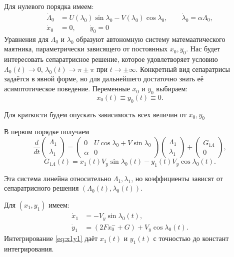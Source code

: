 Для нулевого порядка имеем:
\begin{equation}
    \begin{aligned}
        \dot{\Lambda}_0 &= U(\lambda_0) \sin\lambda_0 - V(\lambda_0) \cos\lambda_0, \qquad
        \dot{\lambda}_0 = \alpha \Lambda_0, \\[1.5ex]
        \dot{x}_0 &= 0, \qquad \dot{y}_0 = 0
    \end{aligned}
    \label{leadorder}
\end{equation}
Уравнения для $\Lambda_0$ и $\lambda_0$ образуют автономную систему матемаатического маятника, параметрически зависящего от постоянных $x_0, y_0$. Нас будет интересовать сепаратрисное решение, которое удовлетворяет условию $\Lambda_0(t) \to 0$, $\lambda_0(t) \to \pi \pm \pi$ при $t \to \pm\infty$. Конкретный вид сепаратрисы задаётся в явной форме, но для дальнейшего достаточно знать её асимптотическое поведение.
Переменные $x_0$ и $y_0$ выбираем:
$$
x_0(t) \equiv  y_0(t) \equiv 0.
$$

Для краткости будем опускать зависимость всех величин от $x_0,y_0$

В первом порядке получаем
\begin{equation}
    \frac{d}{dt} \begin{pmatrix} \Lambda_1 \\ \lambda_1 \end{pmatrix}
    = \begin{pmatrix}
        0 & U\cos\lambda_0 + V\sin\lambda_0 \\
        \alpha & 0
    \end{pmatrix}
    \begin{pmatrix} \Lambda_1 \\ \lambda_1 \end{pmatrix}
    +
    \begin{pmatrix} G_{1 \Lambda} \\ 0 \end{pmatrix},
    \label{1order}
\end{equation}
$$
G_{1 \Lambda}(t) = x_1(t) V_y \sin \lambda_0(t) - y_1(t) V_y \cos \lambda_0(t).
$$

Эта система линейна относительно $\Lambda_1,\lambda_1$, но коэффициенты зависят от сепаратрисного решения $(\Lambda_0(t),\lambda_0(t))$.

Для $(x_1,y_1)$ имеем:
\begin{equation}
    \begin{aligned}
        \dot{x}_1 &= -V_y \sin \lambda_0(t), \\[1.5ex]
        \dot{y}_1 &= (2F x_0^- + G) + V_y \cos \lambda_0(t).
    \end{aligned}
    \label{eq:x1y1}
\end{equation}
Интегрирование \eqref{eq:x1y1} даёт $x_1(t)$ и $y_1(t)$ с точностью до констант интегрирования.

